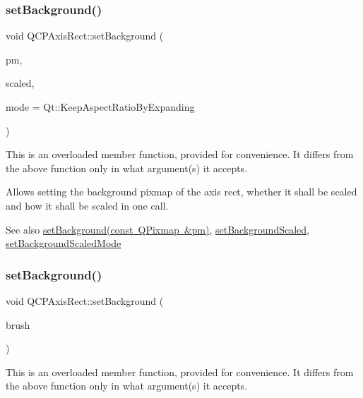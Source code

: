 \subsubsection{\texorpdfstring{set\+Background()}{setBackground()}\hspace{0.1cm}{\footnotesize\ttfamily [2/3]}}
{\footnotesize\ttfamily void Q\+C\+P\+Axis\+Rect\+::set\+Background (\begin{DoxyParamCaption}\item[{const Q\+Pixmap \&}]{pm,  }\item[{bool}]{scaled,  }\item[{Qt\+::\+Aspect\+Ratio\+Mode}]{mode = {\ttfamily Qt\+:\+:KeepAspectRatioByExpanding} }\end{DoxyParamCaption})}

This is an overloaded member function, provided for convenience. It differs from the above function only in what argument(s) it accepts.

Allows setting the background pixmap of the axis rect, whether it shall be scaled and how it shall be scaled in one call.

\begin{DoxySeeAlso}{See also}
\mbox{\hyperlink{class_q_c_p_axis_rect_af615ab5e52b8e0a9a0eff415b6559db5}{set\+Background(const Q\+Pixmap \&pm)}}, \mbox{\hyperlink{class_q_c_p_axis_rect_ae6d36c3e0e968ffb991170a018e7b503}{set\+Background\+Scaled}}, \mbox{\hyperlink{class_q_c_p_axis_rect_a5ef77ea829c9de7ba248e473f48f7305}{set\+Background\+Scaled\+Mode}} 
\end{DoxySeeAlso}
\mbox{\label{class_q_c_p_axis_rect_a22a22b8668735438dc06f9a55fe46b33}} 
\subsubsection{\texorpdfstring{set\+Background()}{setBackground()}\hspace{0.1cm}{\footnotesize\ttfamily [3/3]}}
{\footnotesize\ttfamily void Q\+C\+P\+Axis\+Rect\+::set\+Background (\begin{DoxyParamCaption}\item[{const Q\+Brush \&}]{brush }\end{DoxyParamCaption})}

This is an overloaded member function, provided for convenience. It differs from the above function only in what argument(s) it accepts.

